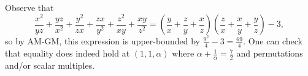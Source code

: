 Observe that \[\frac{x^2}{yz}+\frac{yz}{x^2}+\frac{y^2}{zx}+\frac{zx}{y^2}+\frac{z^2}{xy}+\frac{xy}{z^2}=\left(\frac{y}{x}+\frac{z}{y}+\frac{x}{z}\right)\left(\frac{z}{x}+\frac{x}{y}+\frac{y}{z}\right)-3,\] so by AM-GM, this expression is upper-bounded by $\frac{9^2}{4}-3=\boxed{\frac{69}{4}}$. One can check that equality does indeed hold at $\left(1,1,\alpha\right)$ where $\alpha+\frac{1}{\alpha}=\frac{7}{2}$ and permutations and/or scalar multiples.